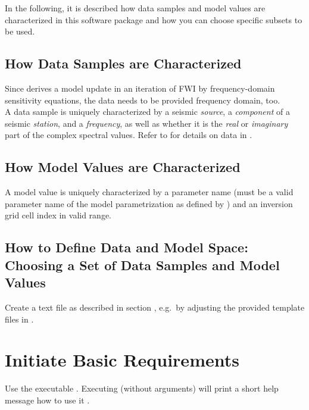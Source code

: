 In the following, it is described how data samples and model values are characterized in this software package and 
how you can choose specific subsets to be used. 
\subsection{How Data Samples are Characterized}
Since \ASKI{} derives a model update in an iteration of FWI by frequency-domain sensitivity equations, 
the data needs to be provided frequency domain, too.\\
A data sample is uniquely characterized by a seismic \emph{source}, a \emph{component} 
of a seismic \emph{station}, and a \emph{frequency}, as well as whether it is the \emph{real} or \emph{imaginary} part 
of the complex spectral values. Refer to  for details on data in \ASKI{}.
\subsection{How Model Values are Characterized} \label{basic_steps,sec:dmspace,sub:mparam}
A model value is uniquely  characterized by a parameter name (must be a valid parameter name of the model
parametrization as defined by  ) 
and an inversion grid cell index in valid range.
\subsection{How to Define Data and Model Space: Choosing a Set of Data Samples and Model Values}
Create a text file as described in section , e.g.\ by adjusting the provided
template files in .
%
\section{Initiate Basic Requirements} \label{basic_steps,sec:initBasics}
%
Use the executable . Executing  (without arguments) 
will print a short help message how to use it .


